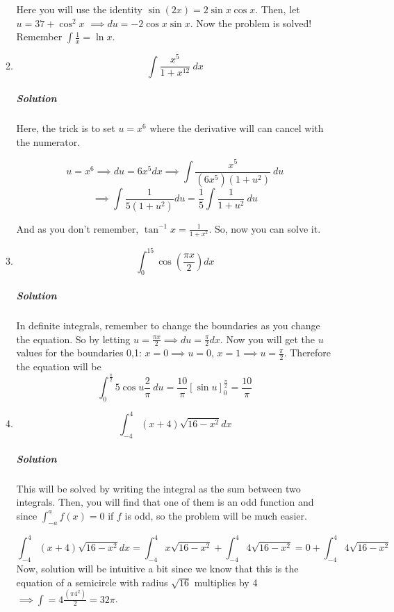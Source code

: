 \documentclass{article}
\begin{document}
\begin{enumerate}[1.]
\begin{enumerate}[1.]
Here you will use the identity $ \sin(2x) = 2 \sin{ x } \cos{ x }  $. Then, let $ u = 37+\cos^2x 
$ $\implies du=-2 \cos{ x } \sin{ x } $. Now the problem is solved! Remember $\int \frac{1}{x}= \ln{x}$.

\item \[ \int \frac{x^5}{1+x^{12}}\ dx \]

	\subparagraph{Solution}
	Here, the trick is to set $u=x^6$ where the derivative will can cancel with the numerator. 

		\[
			u = x^6 \implies du = 6x^5dx \implies \int \frac{ x^5 }{ (6x^5) (1+u^2) } \ du 
		\]
		\[
			\implies \int \frac{ 1 }{ 5(1+u^2) } du = \frac{1}{5} \int \frac{ 1 }{ 1 + u^2 }\ du
		\]
	
	And as you don't remember, $ \tan^{-1}x= \frac{ 1 }{ 1 + x^2 }  $. So, now you can solve it. 

\item \[
		\int_0^15 \cos{ (\frac{ \pi x }{ 2 } ) } dx
\]

\subparagraph{Solution}
In definite integrals, remember to change the boundaries as you change the equation. 
So by letting $u= \frac{ \pi x  }{ 2 } \implies du = \frac{\pi}{2} dx$. Now you will get the $u$ values for the boundaries 0,1: $ x=0 \implies u = 0 $, $ x = 1 \implies u = \frac{\pi}{2} $. Therefore the equation will be
\[
	\int_0^{\frac{\pi}{2}} 5 \cos{ u } \frac{2}{\pi}\ du = \frac{10}{\pi} \left[ \sin{ u }  \right]^{ \frac{\pi}{2} }_{0} = \frac{10}{\pi}
\]

\item \[ \int^4_{-4} (x+4) \sqrt{ 16-x^2 } dx \]
	
	\subparagraph{Solution}
		This will be solved by writing the integral as the sum between two integrals. Then, you will find that one of them is an odd function and since $ \int^a_{-a}f(x) = 0 $ if $ f $ is odd, so the problem will be much easier.

\[ \int^4_{-4} (x+4) \sqrt{ 16-x^2 } dx 
	= \int^4_{-4} x  \sqrt{ 16-x^2 } + \int^4_{-4} 4  \sqrt{ 16-x^2 } = 0 + \int^4_{-4} 4  \sqrt{ 16-x^2 }
		\]
		Now, solution will be intuitive a bit since we know that this is the equation of a semicircle with radius $ \sqrt{16} $ multiplies by 4 $ \implies \int = 4 \frac{ (\pi 4^2) } {2} = 32\pi  $.


		
\end{enumerate}











\end{enumerate}
\end{document}
